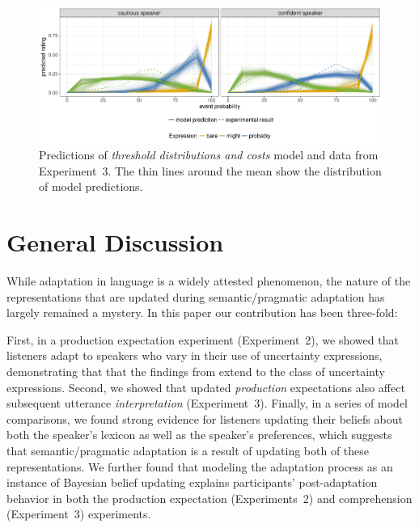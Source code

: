\documentclass[man, floatsintext]{apa6}
\newcommand{\jd}[1]{\textcolor{PinkyPurple}{\textbf{[jd: #1]}}}
\begin{document}
\begin{figure}
\includegraphics[width=\textwidth]{plots/adaptation-posterior-comp-data.pdf}
\caption{Predictions of \textit{threshold distributions and costs} model and data from Experiment~3. The thin lines around the mean show the distribution of model predictions.  \label{fig:post-exposure-comp-data}}
\end{figure}

\section{General Discussion}

While adaptation in language is a widely attested phenomenon, the nature of the representations that are updated during semantic/pragmatic adaptation has largely remained a mystery. In this paper our contribution has been three-fold: %


First, in a production expectation experiment (Experiment~2), we showed that listeners adapt to speakers who vary in their use of uncertainty expressions, demonstrating that that 
the findings from \textcite{Yildirim2016} extend to the class of uncertainty expressions. Second, we showed that updated \emph{production} expectations also affect subsequent utterance \emph{interpretation}  (Experiment~3). Finally, in a series of model comparisons, we found strong evidence for listeners updating their beliefs about both the speaker's lexicon as well as the speaker's preferences, which suggests
that semantic/pragmatic adaptation is a result of updating both of these representations. We further found that modeling the adaptation process as an instance of Bayesian
belief updating explains participants' post-adaptation behavior in both the production expectation (Experiments~2) and comprehension (Experiment~3) experiments. 
\end{document}
